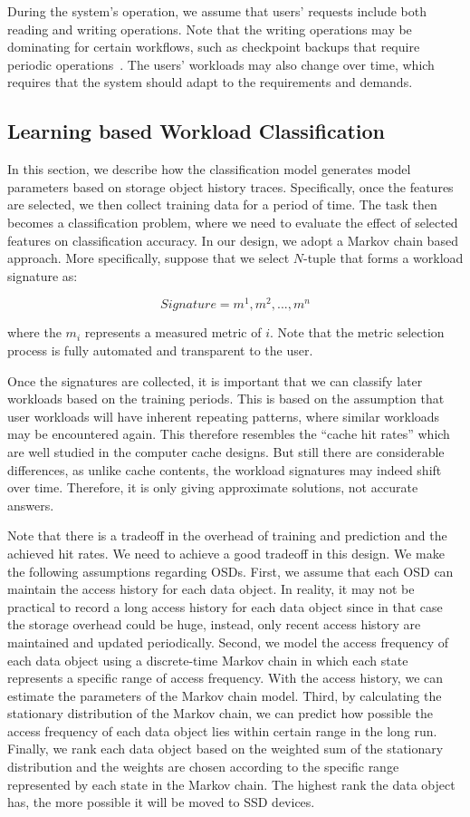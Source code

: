 During the system's operation, we assume that users' requests include both reading and writing operations. Note that the writing operations may be dominating for certain workflows, such as checkpoint backups that require periodic operations~\cite{}. The users' workloads may also change over time, which requires that the system should adapt to the requirements and demands.



\subsection{Learning based Workload Classification}

In this section, we describe how the classification model generates model parameters based on storage object history traces. Specifically, once the features are selected, we then collect training data for a period of time. The task then becomes a classification problem, where we need to evaluate the effect of selected features on classification accuracy. In our design, we adopt a Markov chain based approach. More specifically, suppose that we select $N$-tuple that forms a workload signature as:

\[
  Signature = {m^1, m^2, ..., m^n}
\]

where the $m_i$ represents a measured metric of $i$. Note that the metric selection process is fully automated and transparent to the user.

Once the signatures are collected, it is important that we can classify later workloads based on the training periods. This is based on the assumption that user workloads will have inherent repeating patterns, where similar workloads may be encountered again. This therefore resembles the ``cache hit rates'' which are well studied in the computer cache designs. But still there are considerable differences, as unlike cache contents, the workload signatures may indeed shift over time. Therefore, it is only giving approximate solutions, not accurate answers.

Note that there is a tradeoff in the overhead of training and prediction and the achieved hit rates. We need to achieve a good tradeoff in this design. We make the following assumptions regarding OSDs. First, we assume that each OSD can maintain the access history for each data object. In reality, it may not be practical to record a long access history for each data object since in that case the storage overhead could be huge, instead, only recent access history are maintained and updated periodically. Second, we model the access frequency of each data object using a discrete-time Markov chain in which each state represents a specific range of access frequency. With the access history, we can estimate the parameters of the Markov chain model. Third, by calculating the stationary distribution of the Markov chain, we can predict how possible the access frequency of each data object lies within certain range in the long run. Finally, we rank each data object based on the weighted sum of the stationary distribution and the weights are chosen according to the specific range represented by each state in the Markov chain. The highest rank the data object has, the more possible it will be moved to SSD devices.

